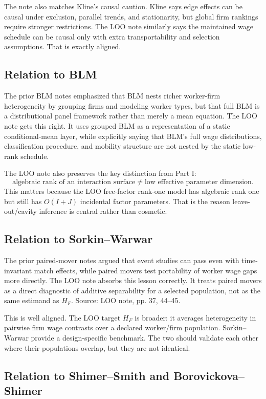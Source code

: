 \documentclass[11pt]{article}
\begin{document}
The note also matches Kline's causal caution. Kline says edge effects can be
causal under exclusion, parallel trends, and stationarity, but global firm
rankings require stronger restrictions. The LOO note similarly says the
maintained wage schedule can be causal only with extra transportability and
selection assumptions. That is exactly aligned.

\subsection{Relation to BLM}

The prior BLM notes emphasized that BLM nests richer worker-firm heterogeneity
by grouping firms and modeling worker types, but that full BLM is a
distributional panel framework rather than merely a mean equation. The LOO note
gets this right. It uses grouped BLM as a representation of a static
conditional-mean layer, while explicitly saying that BLM's full wage
distributions, classification procedure, and mobility structure are not nested
by the static low-rank schedule.

The LOO note also preserves the key distinction from Part I:
\[
\text{algebraic rank of an interaction surface}
\neq
\text{low effective parameter dimension}.
\]
This matters because the LOO free-factor rank-one model has algebraic rank one
but still has \(O(I+J)\) incidental factor parameters. That is the reason
leave-out/cavity inference is central rather than cosmetic.

\subsection{Relation to Sorkin--Warwar}

The prior paired-mover notes argued that event studies can pass even with
time-invariant match effects, while paired movers test portability of worker
wage gaps more directly. The LOO note absorbs this lesson correctly. It treats
paired movers as a direct diagnostic of additive separability for a selected
population, not as the same estimand as \(H_F\). Source: LOO note, pp. 37, 44--45.

This is well aligned. The LOO target \(H_F\) is broader: it averages
heterogeneity in pairwise firm wage contrasts over a declared worker/firm
population. Sorkin--Warwar provide a design-specific benchmark. The two should
validate each other where their populations overlap, but they are not identical.

\subsection{Relation to Shimer--Smith and Borovickova--Shimer}
\end{document}
